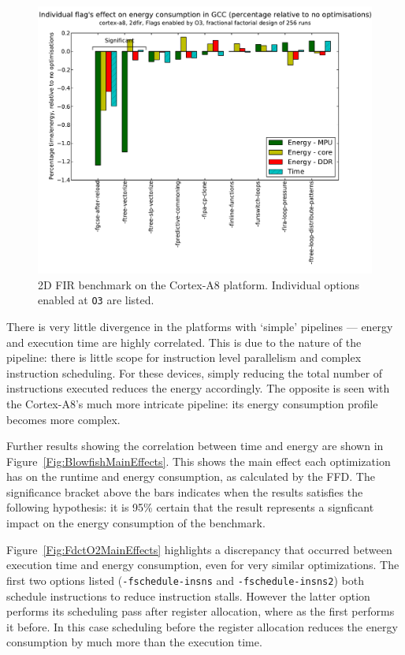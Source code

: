 \documentclass[twocolumn]{article}
\let\oldcaption\caption
\renewcommand{\caption}[1]{\oldcaption{\textup{#1}}}
\begin{document}
\begin{figure}[t]
	\includegraphics[width=\linewidth,clip,trim=0.5cm 0 2cm 1.8cm]{cortex-a8/O3_main_effects_2dfir.pdf}
	\caption{2D FIR benchmark on the Cortex-A8 platform. Individual options enabled at \texttt{O3} are listed.}
	\label{Fig:O3_2dfir_A8}
\end{figure}

There is very little divergence in the platforms with `simple' pipelines --- energy and execution time are highly correlated. This is due to the nature of the pipeline: there is little scope for instruction level parallelism and complex instruction scheduling. For these devices, simply reducing the total number of instructions executed reduces the energy accordingly. The opposite is seen with the Cortex-A8's much more intricate pipeline: its energy consumption profile becomes more complex.

Further results showing the correlation between time and energy are shown in Figure~\ref{Fig:BlowfishMainEffects}. This shows the main effect each optimization has on the runtime and energy consumption, as calculated by the FFD. The significance bracket above the bars indicates when the results satisfies the following hypothesis: it is 95\% certain that the result represents a signficant impact on the energy consumption of the benchmark.

Figure~\ref{Fig:FdctO2MainEffects} highlights a discrepancy that occurred between execution time and energy consumption, even for very similar optimizations. The first two options listed (\texttt{-fschedule-insns} and \texttt{-fschedule-insns2}) both schedule instructions to reduce instruction stalls. However the latter option performs its scheduling pass after register allocation, where as the first performs it before. In this case scheduling before the register allocation reduces the energy consumption by much more than the execution time.
\end{document}
